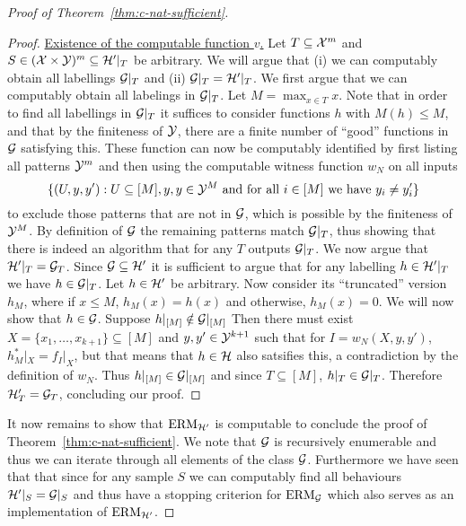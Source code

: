 \documentclass[11pt]{article}
\begin{document}
\begin{proof}[Proof of Theorem~\ref{thm:c-nat-sufficient}]
\begin{proof}
\underline{Existence of the computable function $v$.}
    Let $T\subseteq \mathcal{X}^m$ and $S\in(\mathcal{X}\times\mathcal{Y})^m \subseteq \mathcal{H}'|_{T}$ be arbitrary. We will argue that (i) we can computably obtain all labellings $\mathcal{G}|_T$ and (ii) $\mathcal{G}|_T = \mathcal{H}'|_T$.
    We first argue that we can computably obtain all labelings in $\mathcal{G}|_T$. Let $M=\max_{x\in T}x$. Note that in order to find all labellings in $\mathcal{G}|_T$ it suffices to consider functions $h$ with $ M(h)\leq M$, and that by the finiteness of $\mathcal{Y}$, there are a finite number of ``good'' functions in $\mathcal{G}$ satisfying this. These function can now be computably identified by first listing all patterns $\mathcal{Y}^{m}$ and then using the computable witness function $w_N$ on all inputs 
    \begin{equation}
    \label{eqn:patterns}
        \{(U,y,y'): U\subseteq [M], y,y\in \mathcal{Y}^M \text{ and for all } i \in [M] \text{ we have } y_i \neq y'_i \}
    \end{equation} 
    to exclude those patterns that are not in $\mathcal{G}$, which is possible by the finiteness of $\mathcal{Y}^M$. By definition of $\mathcal{G}$ the remaining patterns match $\mathcal{G}|_T$, thus showing that there is indeed an algorithm that for any $T$ outputs $\mathcal{G}|_T$.
    We now argue that $\mathcal{H}'|_T = \mathcal{G}_T$. 
    Since $\mathcal{G}\subseteq \mathcal{H}'$ it is sufficient to argue that for any labelling $h\in \mathcal{H}'|_T$ we have $h\in \mathcal{G}|_T$.
    Let $h\in \mathcal{H}'$ be arbitrary. Now consider its ``truncated'' version $h_M$, where if $x\leq M$, $h_M(x)=h(x)$ and otherwise, $h_M(x)=0$. 
    We will now show that $h \in \mathcal{G}$.  
    Suppose $h|_{[M]} \notin \mathcal{G}|_{[M]}$
    Then there must exist $X=\{x_1,\dots,x_{k+1}\}\subseteq[M]$ and $y,y'\in\mathcal{Y}^{k+1}$ such that for $I=w_N(X,y,y')$, $h^*_M|_X=f_I|_X$, but that means that $h\in\mathcal{H}$ also satsifies this, a contradiction by the definition of $w_N$. 
    Thus $h|_{[M]} \in \mathcal{G}|_{[M]}$ and since $T\subseteq [M]$, $h|_T \in \mathcal{G}|_{T}$. Therefore $\mathcal{H}'_T = \mathcal{G}_T$, concluding our proof.
\end{proof}
It now remains to show that $\mathrm{ERM}_{\mathcal{H}'}$ is computable to conclude the proof of Theorem~\ref{thm:c-nat-sufficient}. We note that $\mathcal{G}$ is recursively enumerable and thus we can iterate through all elements of the class $\mathcal{G}$. Furthermore we have seen that that since for any sample $S$ we can computably find all behaviours $\mathcal{H}'|_S = \mathcal{G}|_S$ and thus have a stopping criterion for $\mathrm{ERM}_{\mathcal{G}}$ which also serves as an implementation of $\mathrm{ERM}_{\mathcal{H}'}$.
\end{proof}
\end{document}
